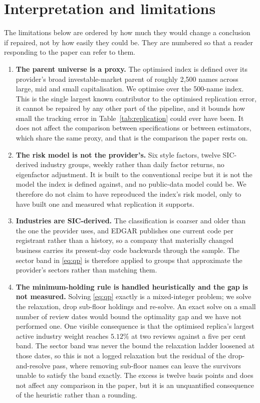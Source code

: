\section{Interpretation and limitations}
\label{sec:limits}
The limitations below are ordered by how much they would change a conclusion if
repaired, not by how easily they could be. They are numbered so that a reader
responding to the paper can refer to them.

\begin{enumerate}[label=L\arabic*., leftmargin=*, itemsep=4pt]

\item \textbf{The parent universe is a proxy.} The optimised index is defined over
its provider's broad investable-market parent of roughly 2{,}500 names across
large, mid and small capitalisation. We optimise over the 500-name index. This
is the single largest known contributor to the optimised replication error, it
cannot be repaired by any other part of the pipeline, and it bounds how small
the tracking error in Table~\ref{tab:replication} could ever have been. It does
not affect the comparison between specifications or between estimators, which
share the same proxy, and that is the comparison the paper rests on.

\item \textbf{The risk model is not the provider's.} Six style factors, twelve
SIC-derived industry groups, weekly rather than daily factor returns, no
eigenfactor adjustment. It is built to the conventional recipe but it is not
the model the index is defined against, and no public-data model could be. We
therefore do not claim to have reproduced the index's risk model, only to have
built one and measured what replication it supports.

\item \textbf{Industries are SIC-derived.} The classification is coarser and older
than the one the provider uses, and EDGAR publishes one current code per
registrant rather than a history, so a company that materially changed business
carries its present-day code backwards through the sample. The sector band in
\eqref{eq:qp} is therefore applied to groups that approximate the provider's
sectors rather than matching them.

\item \textbf{The minimum-holding rule is handled heuristically and the gap is not
measured.} Solving \eqref{eq:qp} exactly is a mixed-integer problem; we solve
the relaxation, drop sub-floor holdings and re-solve. An exact solve on a small
number of review dates would bound the optimality gap and we have not performed
one. One visible consequence is that the optimised replica's largest active
industry weight reaches $5.12\%$ at two reviews against a five per cent band.
The sector band was never the bound the relaxation ladder loosened at those
dates, so this is not a logged relaxation but the residual of the
drop-and-resolve pass, where removing sub-floor names can leave the survivors
unable to satisfy the band exactly. The excess is twelve basis points and does
not affect any comparison in the paper, but it is an unquantified consequence
of the heuristic rather than a rounding.


\end{enumerate}
